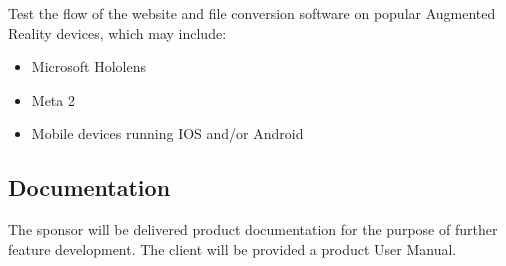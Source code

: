 Test the flow of the website and file conversion software on popular Augmented Reality devices, which may include:
\begin{itemize}
	\item Microsoft Hololens
	\item Meta 2
	\item Mobile devices running IOS and/or Android
\end{itemize}

\subsection{Documentation}

The sponsor will be delivered product documentation for the purpose of further feature development. The client will be provided a product User Manual. 
